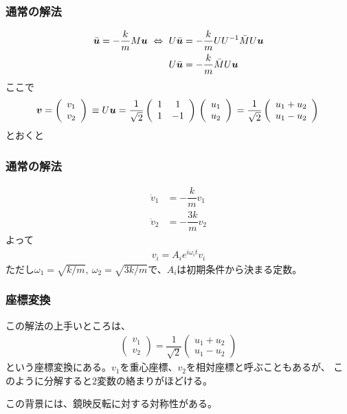 \documentclass[12pt, t]{beamer}
\newcommand{\lr}[1]{\left({}#1\right){}}
\begin{document}
\begin{frame}
\frametitle{通常の解法}
\begin{align}
  \ddot{\bm{u}} = -\dfrac{k}{m} M \bm{u} \ \Leftrightarrow \ 
  U \ddot{\bm{u}} &= -\dfrac{k}{m} U U^{-1} \bar{M} U \bm{u} \notag \\
  U \ddot{\bm{u}} &= -\dfrac{k}{m} \bar{M} U \bm{u} \notag
\end{align}
ここで
\begin{align}
  \bm{v} = \lr{
  \begin{array}{c}
    v_1 \\
    v_2
  \end{array}} \equiv
  U \bm{u} = \dfrac{1}{\sqrt{2}} \lr{
  \begin{array}{cc}
    1 & 1 \\
    1 & -1
  \end{array}} \lr{
  \begin{array}{c}
    u_1 \\
    u_2
  \end{array}}
  = \dfrac{1}{\sqrt{2}} \lr{
  \begin{array}{c}
    u_1 + u_2 \\
    u_1 - u_2
  \end{array}} \notag
\end{align}
とおくと
\end{frame}


\begin{frame}
\frametitle{通常の解法}
\begin{align}
  \ddot{v}_1 &= -\dfrac{k}{m} v_1 \\
  \ddot{v}_2 &= -\dfrac{3k}{m} v_2
\end{align}
よって
\begin{align}
  v_i = A_i e^{i \omega_i t} v_i
\end{align}
ただし$\omega_1 = \sqrt{k/m},\ \omega_2 = \sqrt{3k/m}$で、$A_i$は初期条件から決まる定数。
\end{frame}

\begin{frame}
\frametitle{座標変換}
この解法の上手いところは、
\begin{align}
  \lr{
    \begin{array}{c}
    v_1 \\
    v_2
  \end{array}} = \dfrac{1}{\sqrt{2}} \lr{
  \begin{array}{c}
    u_1 + u_2 \\
    u_1 - u_2
  \end{array}}
\end{align}
という座標変換にある。$v_1$を重心座標、$v_2$を相対座標と呼ぶこともあるが、
このように分解すると$2$変数の絡まりがほどける。

この背景には、鏡映反転に対する対称性がある。
\end{frame}
\end{document}
